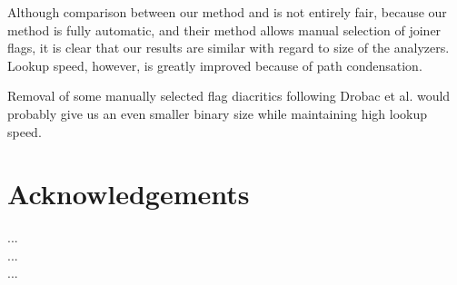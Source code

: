 \documentclass[11pt]{article}
\begin{document}
Although comparison between our method and \cite{drobac2014} is not
entirely fair, because our method is fully automatic, and their method
allows manual selection of joiner flags, it is clear that our results
are similar with regard to size of the analyzers. Lookup speed, however,
is greatly improved because of path condensation.

Removal of some manually selected flag diacritics following Drobac et
al.  would probably give us an even smaller binary
size while maintaining high lookup speed.

\section{Acknowledgements}
...\\
...\\
...


\end{document}
